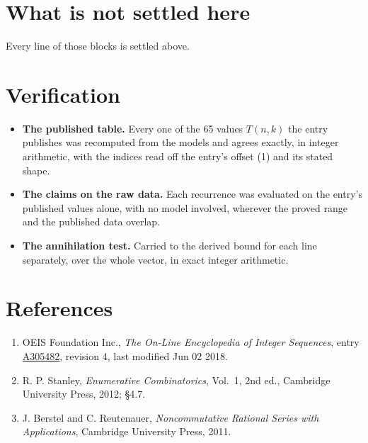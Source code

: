 \documentclass[11pt]{article}
\theoremstyle{definition}
\begin{document}
\section{What is not settled here}

Every line of those blocks is settled above.

\section{Verification}

\begin{itemize}

\item {\bfseries The published table.} Every one of the 65 values $T(n,k)$ the entry publishes was recomputed from the models and agrees exactly, in integer arithmetic, with the indices read off the entry's offset (1) and its stated shape.

\item {\bfseries The claims on the raw data.} Each recurrence was evaluated on the entry's published values alone, with no model involved, wherever the proved range and the published data overlap.

\item {\bfseries The annihilation test.} Carried to the derived bound for each line separately, over the whole vector, in exact integer arithmetic.

\end{itemize}

\section{References}

\begin{enumerate}

\item OEIS Foundation Inc., \emph{The On-Line Encyclopedia of Integer Sequences}, entry \href{https://oeis.org/A305482}{A305482}, revision 4, last modified Jun 02 2018.

\item R. P. Stanley, \emph{Enumerative Combinatorics}, Vol.~1, 2nd ed., Cambridge University Press, 2012; \S4.7.

\item J. Berstel and C. Reutenauer, \emph{Noncommutative Rational Series with Applications}, Cambridge University Press, 2011.

\end{enumerate}
\end{document}
